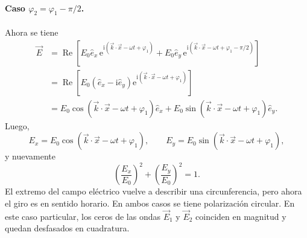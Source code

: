 \documentclass[12pt,a4paper]{article}
\theoremstyle{definition}
\theoremstyle{plain}
\numberwithin{equation}{section}
\theoremstyle{remark}
\newcommand{\ii}{\mathrm{i}}
\newcommand{\ee}{\mathrm{e}}
\begin{document}
\paragraph{Caso $\varphi_2=\varphi_1-\pi/2$.}
Ahora se tiene
\begin{align*}
    \vec E
    &= \operatorname{Re}\left[E_0\hat e_x\,\ee^{\ii\left(\vec k\cdot\vec x-\omega t+\varphi_1\right)}+E_0\hat e_y\,\ee^{\ii\left(\vec k\cdot\vec x-\omega t+\varphi_1-\pi/2\right)}\right] \\
    &= \operatorname{Re}\left[E_0\left(\hat e_x-\ii\hat e_y\right)\ee^{\ii\left(\vec k\cdot\vec x-\omega t+\varphi_1\right)}\right] \\
    &= E_0\cos\left(\vec k\cdot\vec x-\omega t+\varphi_1\right)\hat e_x+E_0\sin\left(\vec k\cdot\vec x-\omega t+\varphi_1\right)\hat e_y.
\end{align*}
Luego,
\begin{equation*}
    E_x=E_0\cos\left(\vec k\cdot\vec x-\omega t+\varphi_1\right),
    \qquad
    E_y=E_0\sin\left(\vec k\cdot\vec x-\omega t+\varphi_1\right),
\end{equation*}
y nuevamente
\begin{equation*}
    \left(\frac{E_x}{E_0}\right)^2+\left(\frac{E_y}{E_0}\right)^2=1.
\end{equation*}
El extremo del campo eléctrico vuelve a describir una circunferencia, pero ahora el giro es en sentido horario. En ambos casos se tiene polarización circular. En este caso particular, los ceros de las ondas $\vec E_1$ y $\vec E_2$ coinciden en magnitud y quedan desfasados en cuadratura.
\end{document}
